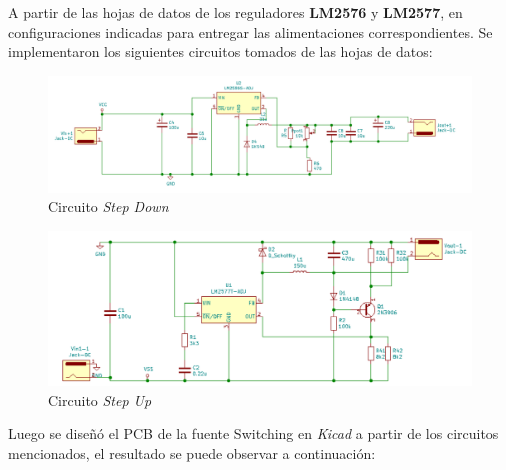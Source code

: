 \par A partir de las hojas de datos de los reguladores \textbf{LM2576} y \textbf{LM2577}, en configuraciones indicadas para entregar las alimentaciones correspondientes. Se implementaron los siguientes circuitos tomados de las hojas de datos:\\

\begin{figure}[H]
    \centering
    \includegraphics[scale=0.48]{img/fuente/fuente_kicad_down.png}
    \caption{Circuito \textit{Step Down}}
    \label{fig:step_down}
\end{figure}

\begin{figure}[H]
    \centering
    \includegraphics[scale=0.5]{img/fuente/fuente_kicad_up.png}
    \caption{Circuito \textit{Step Up}}
    \label{fig:step_up}
\end{figure}

\par Luego se diseñó el PCB de la fuente Switching en \textit{Kicad} a partir de los circuitos mencionados, el resultado se puede observar a continuación:\\


